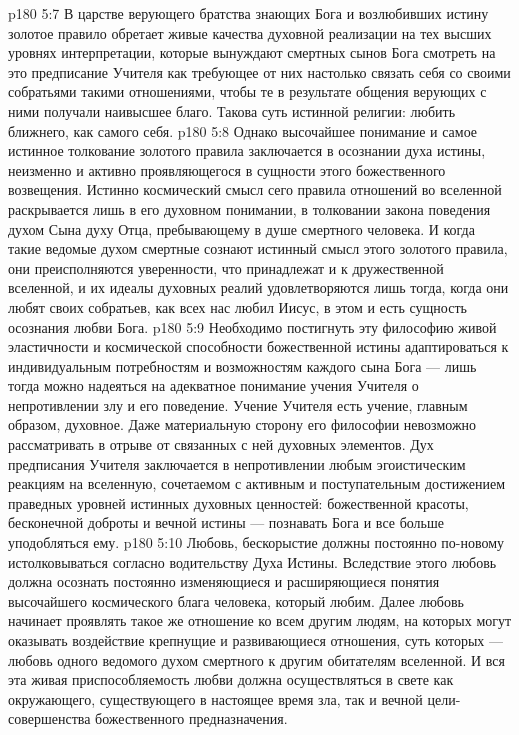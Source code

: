 \vs p180 5:7 В царстве верующего братства знающих Бога и возлюбивших истину золотое правило обретает живые качества духовной реализации на тех высших уровнях интерпретации, которые вынуждают смертных сынов Бога смотреть на это предписание Учителя как требующее от них настолько связать себя со своими собратьями такими отношениями, чтобы те в результате общения верующих с ними получали наивысшее благо. Такова суть истинной религии: любить ближнего, как самого себя.
\vs p180 5:8 Однако высочайшее понимание и самое истинное толкование золотого правила заключается в осознании духа истины, неизменно и активно проявляющегося в сущности этого божественного возвещения. Истинно космический смысл сего правила отношений во вселенной раскрывается лишь в его духовном понимании, в толковании закона поведения духом Сына духу Отца, пребывающему в душе смертного человека. И когда такие ведомые духом смертные сознают истинный смысл этого золотого правила, они преисполняются уверенности, что принадлежат и к дружественной вселенной, и их идеалы духовных реалий удовлетворяются лишь тогда, когда они любят своих собратьев, как всех нас любил Иисус, в этом и есть сущность осознания любви Бога.
\vs p180 5:9 Необходимо постигнуть эту философию живой эластичности и космической способности божественной истины адаптироваться к индивидуальным потребностям и возможностям каждого сына Бога --- лишь тогда можно надеяться на адекватное понимание учения Учителя о непротивлении злу и его поведение. Учение Учителя есть учение, главным образом, духовное. Даже материальную сторону его философии невозможно рассматривать в отрыве от связанных с ней духовных элементов. Дух предписания Учителя заключается в непротивлении любым эгоистическим реакциям на вселенную, сочетаемом с активным и поступательным достижением праведных уровней истинных духовных ценностей: божественной красоты, бесконечной доброты и вечной истины --- познавать Бога и все больше уподобляться ему.
\vs p180 5:10 Любовь, бескорыстие должны постоянно по\hyp{}новому истолковываться согласно водительству Духа Истины. Вследствие этого любовь должна осознать постоянно изменяющиеся и расширяющиеся понятия высочайшего космического блага человека, который любим. Далее любовь начинает проявлять такое же отношение ко всем другим людям, на которых могут оказывать воздействие крепнущие и развивающиеся отношения, суть которых --- любовь одного ведомого духом смертного к другим обитателям вселенной. И вся эта живая приспособляемость любви должна осуществляться в свете как окружающего, существующего в настоящее время зла, так и вечной цели\hyp{}совершенства божественного предназначения.
